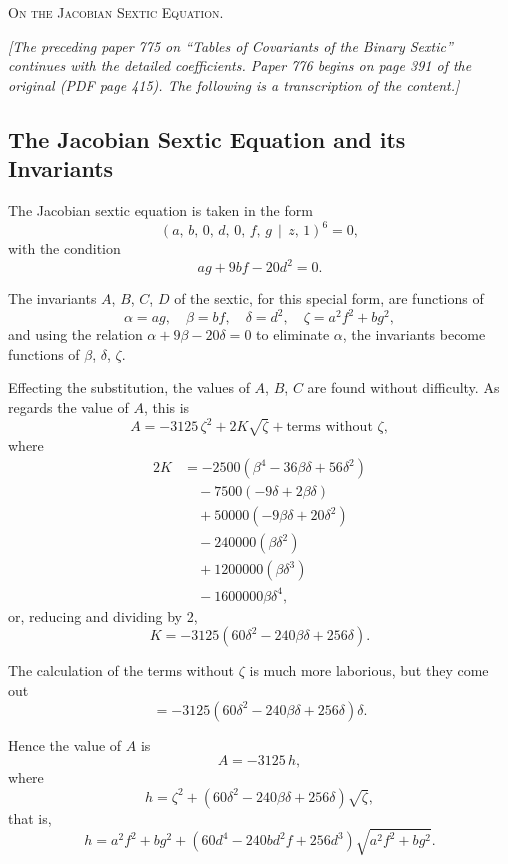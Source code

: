 \documentclass[11pt,a4paper]{book}
\begin{document}
\begin{center}
\Large\scshape On the Jacobian Sextic Equation.
\end{center}

\textit{[The preceding paper 775 on ``Tables of Covariants of the Binary Sextic'' continues with the detailed coefficients. Paper 776 begins on page 391 of the original (PDF page 415). The following is a transcription of the content.]}

\subsection*{The Jacobian Sextic Equation and its Invariants}

The Jacobian sextic equation is taken in the form
\[
(a,\, b,\, 0,\, d,\, 0,\, f,\, g \,\!\!\mid\!\!\, z,\, 1)^{6} = 0,
\]
with the condition
\[
ag + 9bf - 20d^{2} = 0.
\]

The invariants $A$, $B$, $C$, $D$ of the sextic, for this special form, are functions of
\[
\alpha = ag,\quad \beta = bf,\quad \delta = d^{2},\quad \zeta = a^{2}f^{2} + bg^{2},
\]
and using the relation $\alpha + 9\beta - 20\delta = 0$ to eliminate $\alpha$, the invariants become functions of $\beta$, $\delta$, $\zeta$.

Effecting the substitution, the values of $A$, $B$, $C$ are found without difficulty. As regards the value of $A$, this is
\[
A = -3125\,\zeta^{2} + 2K\sqrt{\zeta} + \text{terms without }\zeta,
\]
where
\begin{align*}
2K &= -2500(\beta^{4} - 36\beta\delta + 56\delta^{2}) \\
&\quad -7500(-9\delta + 2\beta\delta) \\
&\quad +50000(-9\beta\delta + 20\delta^{2}) \\
&\quad -240000(\beta\delta^{2}) \\
&\quad +1200000(\beta\delta^{3}) \\
&\quad -1600000\beta\delta^{4},
\end{align*}
or, reducing and dividing by 2,
\[
K = -3125(60\delta^{2} - 240\beta\delta + 256\delta).
\]

The calculation of the terms without $\zeta$ is much more laborious, but they come out
\[
= -3125(60\delta^{2} - 240\beta\delta + 256\delta)\delta.
\]

Hence the value of $A$ is
\[
A = -3125\,h,
\]
where
\[
h = \zeta^{2} + (60\delta^{2} - 240\beta\delta + 256\delta)\sqrt{\zeta},
\]
that is,
\[
h = a^{2}f^{2} + bg^{2} + (60d^{4} - 240bd^{2}f + 256d^{3})\sqrt{a^{2}f^{2} + bg^{2}}.
\]
\end{document}
